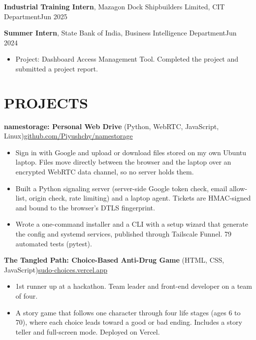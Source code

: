 \documentclass[10pt,letterpaper]{article}
\begin{document}
\vspace{1pt}
\noindent\textbf{Industrial Training Intern}, Mazagon Dock Shipbuilders Limited, CIT Department\hfill Jun 2025\par

\vspace{1pt}
\noindent\textbf{Summer Intern}, State Bank of India, Business Intelligence Department\hfill Jun 2024\par
\begin{itemize}
  \item Project: Dashboard Access Management Tool. Completed the project and submitted a project report.
\end{itemize}

\section*{PROJECTS}
\noindent\textbf{namestorage: Personal Web Drive} (Python, WebRTC, JavaScript, Linux)\hfill \href{https://github.com/Piyushchy/namestorage}{github.com/Piyushchy/namestorage}\par
\begin{itemize}
  \item Sign in with Google and upload or download files stored on my own Ubuntu laptop. Files move directly between the browser and the laptop over an encrypted WebRTC data channel, so no server holds them.
  \item Built a Python signaling server (server-side Google token check, email allow-list, origin check, rate limiting) and a laptop agent. Tickets are HMAC-signed and bound to the browser's DTLS fingerprint.
  \item Wrote a one-command installer and a CLI with a setup wizard that generate the config and systemd services, published through Tailscale Funnel. 79 automated tests (pytest).
\end{itemize}

\vspace{1pt}
\noindent\textbf{The Tangled Path: Choice-Based Anti-Drug Game} (HTML, CSS, JavaScript)\hfill \href{https://sudo-choices.vercel.app/}{sudo-choices.vercel.app}\par
\begin{itemize}
  \item 1st runner up at a hackathon. Team leader and front-end developer on a team of four.
  \item A story game that follows one character through four life stages (ages 6 to 70), where each choice leads toward a good or bad ending. Includes a story teller and full-screen mode. Deployed on Vercel.
\end{itemize}
\end{document}
